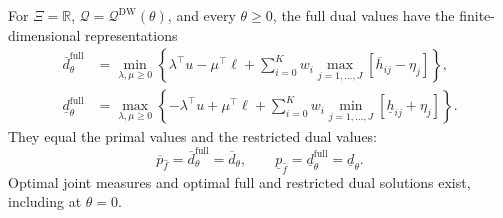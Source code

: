 \begin{theorem}
  \label{thm-finite-dual-reformulations}
  For $\Xi=\mathbb R$, $\mathscr Q=\mathscr Q^{\mathrm{DW}}(\theta)$, and every $\theta\ge0$, the full dual values have the finite-dimensional representations
  \begin{align}
    \overline d_\theta^{\mathrm{full}}
    &=\min_{\lambda,\mu\ge0}\left\{
    \lambda^\top u-\mu^\top\ell+
    \sum_{i=0}^K w_i\max_{j=1,\ldots,J}\left[\overline h_{ij}-\eta_j\right]\right\},
    \label{eq-finite-upper-dual}\\
    \underline d_\theta^{\mathrm{full}}
    &=\max_{\lambda,\mu\ge0}\left\{
    -\lambda^\top u+\mu^\top\ell+
    \sum_{i=0}^K w_i\min_{j=1,\ldots,J}\left[\underline h_{ij}+\eta_j\right]\right\}.
    \label{eq-finite-lower-dual}
  \end{align}
  They equal the primal values and the restricted dual values:
  \begin{equation}
    \overline p_{\hat f}=\overline d_\theta^{\mathrm{full}}=\overline d_\theta,
    \qquad
    \underline p_{\hat f}=\underline d_\theta^{\mathrm{full}}=\underline d_\theta.
    \label{eq-strong-duality}
  \end{equation}
  Optimal joint measures and optimal full and restricted dual solutions exist, including at $\theta=0$.
\end{theorem}
